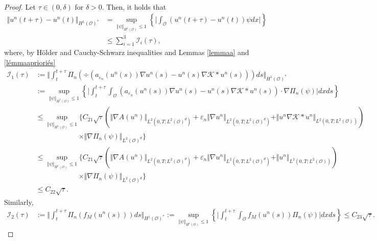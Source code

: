 \documentclass[10pt,number,preprint,times]{elsarticle}
\numberwithin{equation}{section} %
\begin{document}
\begin{proof}
	Let $\tau \in (0,\delta)$ for $\delta>0$. Then, it holds that 
	\begin{align*}
		\Vert u^n(t+\tau)-u^n(t) \Vert_{H^1(\mathcal{O})^*}&=\underset{\Vert \psi \Vert_{H^1(\mathcal{O})} \leq 1}{\sup} \left\{\bigg \vert \int_{\mathcal{O}} (u^n(t+\tau)-u^n(t)) \psi dx  \bigg \vert \right\}\\
		&\leq \sum_{i=1}^3 \mathscr{I}_i(\tau),
	\end{align*}
	where, by H\"{o}lder and Cauchy-Schwarz inequalities and Lemmas \ref{lemmaa} and \ref{lémmaaprioriés}
{\color{black}
	\begin{equation}\label{est-dual}\begin{split}
		\mathscr{I}_1(\tau)&:=\bigg \Vert \int_{t}^{t + \tau}  \Pi_n\left( \div\left(a_{\varepsilon_n}(u^n(s)) \nabla u^n(s)-u^n(s)\nabla \mathcal{K} \ast u^n(s)\right)\right)ds \bigg \Vert _{H^1(\mathcal{O})^*} \\
		&:=\underset{\Vert \psi \Vert_{H^1(\mathcal{O})} \leq 1}{\sup}\left\{\bigg \vert \int_{t}^{t + \tau} \int_{\mathcal{O}} \left(a_{\varepsilon_n}(u^n(s)) \nabla u^n(s)-u^n(s)\nabla \mathcal{K} \ast u^n(s)\right) \cdot \nabla \Pi_n(\psi) \bigg \vert dxds \right\}\\
		&\leq \underset{\Vert \psi \Vert_{H^1(\mathcal{O})} \leq 1}{\sup} \Biggl\{ C_{21} \sqrt{\tau} \left(\Vert \nabla A(u^n)\Vert_{L^2(0,T;L^2(\mathcal{O})^d)}+\varepsilon_n\Vert \nabla u^n\Vert_{L^2(0,T;L^2(\mathcal{O})^d)}+\Vert  u^n\nabla \mathcal{K} \ast u^n\Vert_{L^2(0,T;L^2(\mathcal{O}))}\right)\\
&\qquad \qquad    \qquad \times \Vert \nabla \Pi_n(\psi)\Vert_{L^2(\mathcal{O})^d} \Biggl\} \\
&\leq \underset{\Vert \psi \Vert_{H^1(\mathcal{O})} \leq 1}{\sup} \Biggl\{ C_{21} \sqrt{\tau} \left(\Vert \nabla A(u^n)\Vert_{L^2(0,T;L^2(\mathcal{O})^d)}+\varepsilon_n\Vert \nabla u^n\Vert_{L^2(0,T;L^2(\mathcal{O})^d)}+\Vert  u^n\Vert_{L^2(0,T;L^2(\mathcal{O}))}\right)\\
&\qquad \qquad    \qquad \times \Vert \nabla \Pi_n(\psi)\Vert_{L^2(\mathcal{O})^d} \Biggl\} \\
		&\leq C_{22} \sqrt{\tau}.
\end{split}	\end{equation}
}
Similarly,
	\begin{align}
	\mathscr{I}_2(\tau)&:=\bigg \Vert \int_{t}^{t + \tau}  \Pi_n\left( f_M(u^n(s))\right)ds \bigg \Vert _{H^1(\mathcal{O})^*}:=\underset{\Vert \psi \Vert_{H^1(\mathcal{O})} \leq 1}{\sup}\left\{\bigg \vert \int_{t}^{t+\tau} \int_{\mathcal{O}} f_M(u^n(s)) \Pi_n(\psi) \bigg \vert dxds\right\} \leq C_{23} \sqrt{\tau}.

\end{align}
\end{proof}
\end{document}
